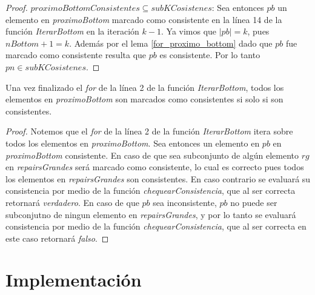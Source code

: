 \documentclass[11pt,a4paper,twoside]{tesis}
\begin{document}
\begin{proof}
\underline{$proximoBottomConsistentes \subseteq subKCosistenes$}: Sea entonces $pb$ un elemento en \textit{proximoBottom} marcado como consistente en la línea 14 de la función \textit{IterarBottom} en la iteración $k-1$. Ya vimos que $|pb| = k$, pues $nBottom + 1 = k$. Además por el lema \ref{for_proximo_bottom} dado que $pb$ fue marcado como consistente resulta que $pb$ es consistente. Por lo tanto $pn \in subKCosistenes$. 

\end{proof}


\begin{lemma}\label{for_proximo_bottom}
Una vez finalizado el \textit{for} de la línea 2 de la función \textit{IterarBottom}, todos los elementos en \textit{proximoBottom} son marcados como consistentes si solo si son consistentes.
\end{lemma}

\begin{proof}
Notemos que el \textit{for} de la línea 2 de la función \textit{IterarBottom} itera sobre todos los elementos en \textit{proximoBottom}. Sea entonces un elemento en $pb$ en \textit{proximoBottom} consistente. En caso de que sea subconjunto de algún elemento $rg$ en \textit{repairsGrandes} será marcado como consistente, lo cual es correcto pues todos los elementos en \textit{repairsGrandes} son consistentes.  En caso contrario se evaluará su consistencia por medio de la función \textit{chequearConsistencia}, que al ser correcta retornará \textit{verdadero}. En caso de que $pb$ sea inconsistente, $pb$ no puede ser subconjutno de ningun elemento en \textit{repairsGrandes}, y por lo tanto se evaluará consistencia por medio de la función \textit{chequearConsistencia}, que al ser correcta en este caso retornará \textit{falso}.  
\end{proof}





















\chapter{Implementación}
\end{document}
